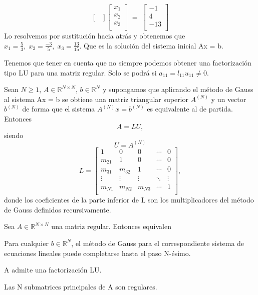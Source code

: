 \begin{ejemplo}
\[\begin{bmatrix}
			\end{bmatrix}
			\begin{bmatrix}
			x_1 \\
			x_2 \\
			x_3 \\
			\end{bmatrix}
			\; = \;
			\begin{bmatrix}
			-1 \\
			4 \\
			-13 \\
			\end{bmatrix}
			\]
			Lo resolvemos por sustitución hacia atrás y obtenemos que $x_1 = \frac{5}{3}, \; x_2 = \frac{-3}{5}, \; x_3 = \frac{13}{15}$. Que es la solución del sistema inicial Ax = b.
			\end{ejemplo}
		Tenemos que tener en cuenta que no siempre podemos obtener una factorización tipo LU para una matriz regular. Solo se podrá si $a_{11} = l_{11}u_{11} \neq 0$.
			\begin{nprop}
			Sean $N \geq 1$, $A \in \mathbb{R}^{N \times N}$, $b \in \mathbb{R}^N$ y supongamos que aplicando el método de Gauss al sistema Ax = b se obtiene una matriz triangular superior $A^{(N)}$ y un vector $b^{(N)}$ de forma que el sistema $A^{(N)}x = b^{(N)}$ es equivalente al de partida. Entonces
			\[ A = LU,\]
			siendo
			\[ U = A^{(N)} \]
			\[ L = \begin{bmatrix}
			1 & 0 & 0 & \cdots & 0 \\
			m_{21} & 1 & 0 & \cdots & 0 \\
			m_{31} & m_{32} & 1 & \cdots & 0 \\
			\vdots &  \vdots & \vdots & \ddots & \vdots \\
			m_{N1} & m_{N2} & m_{N3} & \cdots & 1 \\
			\end{bmatrix}, \]
			donde los coeficientes de la parte inferior de L son los multiplicadores del método de Gauss definidos recursivamente.
			\end{nprop}			
			
			\begin{nth}
			Sea $A \in \mathbb{R}^{N \times N}$ una matriz regular. Entonces equivalen
				\begin{nlist}
				\item Para cualquier $b \in \mathbb{R}^N$, el método de Gauss para el correspondiente sistema de ecuaciones lineales puede completarse hasta el paso N-ésimo.
				\item A admite una factorización LU.
				\item Las N submatrices principales de A son regulares.
				\end{nlist}
			\end{nth}
			
